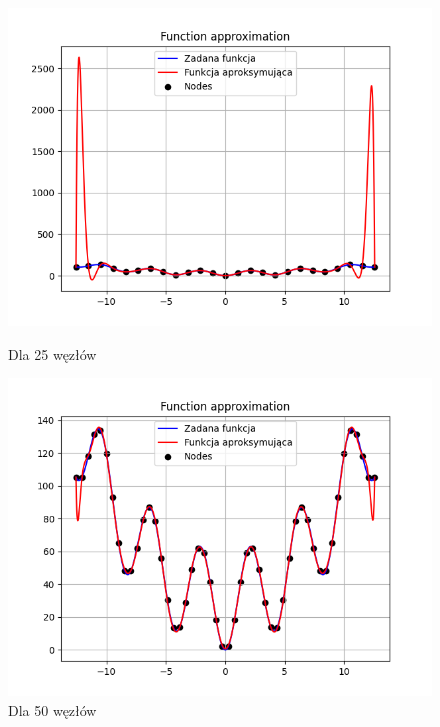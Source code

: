 \documentclass{article}
\begin{document}
\begin{figure}[H]
  \begin{minipage}[b]{0.49\textwidth}
    \begin{minipage}[b]{\textwidth}
      \includegraphics[width=\textwidth]{img51.png}
      \caption{Dla 25 węzłów}
    \end{minipage}
    \vspace*{\fill}
    \begin{minipage}[b]{\textwidth}
      \includegraphics[width=\textwidth]{img52.png}
      \caption{Dla 50 węzłów}
    \end{minipage}
  \end{minipage}
  \hfill
  \begin{minipage}[b]{0.49\textwidth}

\end{minipage}
\end{figure}
\end{document}
